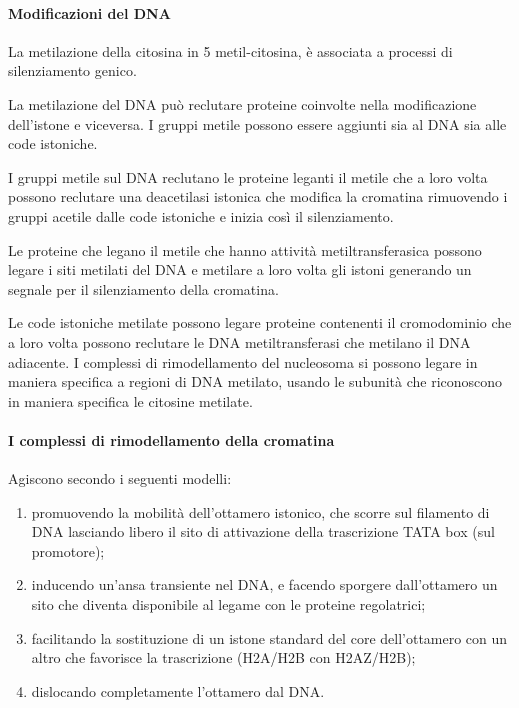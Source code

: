 \documentclass[]{article}
\begin{document}
\paragraph{Modificazioni del DNA}\label{modificazioni-del-dna}

La metilazione della citosina in 5 metil-citosina, è associata a
processi di silenziamento genico.

La metilazione del DNA può reclutare proteine coinvolte nella
modificazione dell'istone e viceversa. I gruppi metile possono essere
aggiunti sia al DNA sia alle code istoniche.

I gruppi metile sul DNA reclutano le proteine leganti il metile che a
loro volta possono reclutare una deacetilasi istonica che modifica la
cromatina rimuovendo i gruppi acetile dalle code istoniche e inizia così
il silenziamento.

Le proteine che legano il metile che hanno attività metiltransferasica
possono legare i siti metilati del DNA e metilare a loro volta gli
istoni generando un segnale per il silenziamento della cromatina.

Le code istoniche metilate possono legare proteine contenenti il
cromodominio che a loro volta possono reclutare le DNA metiltransferasi
che metilano il DNA adiacente. I complessi di rimodellamento del
nucleosoma si possono legare in maniera specifica a regioni di DNA
metilato, usando le subunità che riconoscono in maniera specifica le
citosine metilate.

\paragraph{I complessi di rimodellamento della
cromatina}\label{i-complessi-di-rimodellamento-della-cromatina}

Agiscono secondo i seguenti modelli:

\begin{enumerate}
\def\labelenumi{\arabic{enumi}.}
\itemsep1pt\parskip0pt
\item
  promuovendo la mobilità dell'ottamero istonico, che scorre sul
  filamento di DNA lasciando libero il sito di attivazione della
  trascrizione TATA box (sul promotore);
\item
  inducendo un'ansa transiente nel DNA, e facendo sporgere dall'ottamero
  un sito che diventa disponibile al legame con le proteine regolatrici;
\item
  facilitando la sostituzione di un istone standard del core
  dell'ottamero con un altro che favorisce la trascrizione (H2A/H2B con
  H2AZ/H2B);
\item
  dislocando completamente l'ottamero dal DNA.
\end{enumerate}
\end{document}
